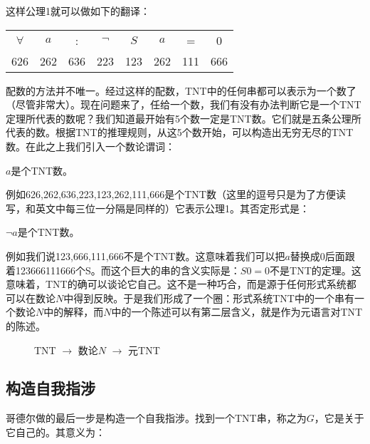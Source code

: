 \documentclass{article}
\begin{document}
这样公理1就可以做如下的翻译：

\begin{tabular}{cccccccc}
$\forall$ & $a$ & : & $\lnot$ & $S$ & $a$ & = & 0 \\
626 & 262 & 636 & 223 & 123 & 262 & 111 & 666 \\
\end{tabular}

配数的方法并不唯一。经过这样的配数，TNT中的任何串都可以表示为一个数了（尽管非常大）。现在问题来了，任给一个数，我们有没有办法判断它是一个TNT定理所代表的数呢？我们知道最开始有5个数一定是TNT数。它们就是五条公理所代表的数。根据TNT的推理规则，从这5个数开始，可以构造出无穷无尽的TNT数。在此之上我们引入一个数论谓词：

\begin{center}
$a$是个TNT数。
\end{center}

例如626,262,636,223,123,262,111,666是个TNT数（这里的逗号只是为了方便读写，和英文中每三位一分隔是同样的）它表示公理1。其否定形式是：

\begin{center}
$\lnot a$是个TNT数。
\end{center}

例如我们说123,666,111,666不是个TNT数。这意味着我们可以把$a$替换成0后面跟着123666111666个S。而这个巨大的串的含义实际是：$S0 = 0$不是TNT的定理。这意味着，TNT的确可以谈论它自己。这不是一种巧合，而是源于任何形式系统都可以在数论$N$中得到反映。于是我们形成了一个圈：形式系统TNT中的一个串有一个数论$N$中的解释，而$N$中的一个陈述可以有第二层含义，就是作为元语言对TNT的陈述。

\begin{figure}[htbp]
\centering
{}
\caption{TNT $\to$ 数论$N$ $\to$ 元TNT}
\label{fig:TNT-N-TNT}
\end{figure}

\subsection{构造自我指涉}

哥德尔做的最后一步是构造一个自我指涉。找到一个TNT串，称之为$G$，它是关于它自己的。其意义为：
\end{document}
